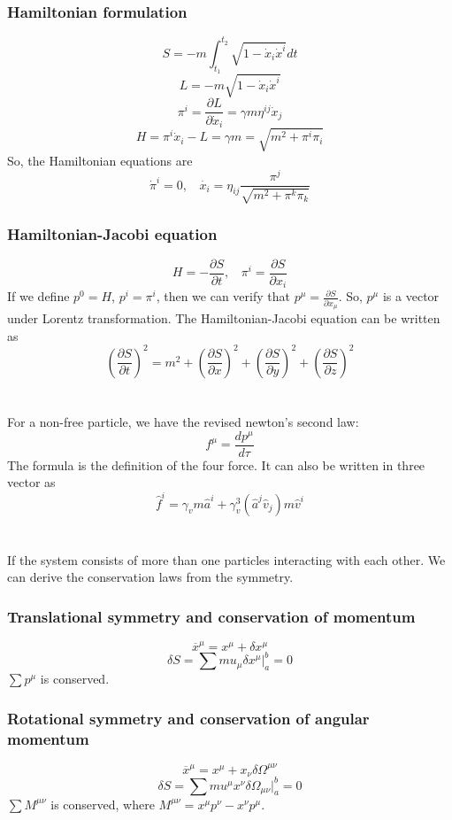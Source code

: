 \documentclass[cyan]{elegantnote}
\begin{document}
\subsubsection{Hamiltonian formulation}
\[S = -m \int_{t_1}^{t_2} \sqrt{1-\dot{x}_i\dot{x}^i} dt\]
\[L = - m \sqrt{1-\dot{x}_i\dot{x}^i}\]
\[\pi^i = \frac{\partial L}{\partial \dot{x}_i} = \gamma m \eta^{ij}\dot{x}_j\]
\[H = \pi^i \dot{x}_i - L = \gamma m = \sqrt{m^2 + \pi^i \pi_i}\]
So, the Hamiltonian equations are
\[\dot{\pi}^i = 0, \ \ \ \ \dot{x_i} = \eta_{ij}\frac{\pi^j}{\sqrt{m^2 + \pi^k \pi_k}}\]
\subsubsection{Hamiltonian-Jacobi equation}
\[H = -\frac{\partial S}{\partial t}, \ \ \ \ \pi^i = \frac{\partial S}{\partial x_i}\]
If we define $p^0 = H$, $p^i = \pi^i$, then we can verify that $p^{\mu} = \frac{\partial S}{\partial x_{\mu}}$. So, $p^{\mu}$ is a vector under Lorentz transformation. The Hamiltonian-Jacobi equation can be written as
\[(\frac{\partial S}{\partial t})^2 = m^2 + (\frac{\partial S}{\partial x})^2 + (\frac{\partial S}{\partial y})^2 + (\frac{\partial S}{\partial z})^2\]\\ \\
For a non-free particle, we have the revised newton's second law:
\[f^{\mu} = \frac{dp^{\mu}}{d\tau}\]
The formula is the definition of the four force. It can also be written in three vector as
\[\hat{f}^i = \gamma_v m \hat{a}^i + \gamma_v^3 (\hat{a}^j \hat{v}_j) m \hat{v}^i\]\\ \\
If the system consists of more than one particles interacting with each other. We can derive the conservation laws from the symmetry.
\subsubsection{Translational symmetry and conservation of momentum}
\[\overline{x}^{\mu} = x^{\mu} + \delta x^{\mu}\]
\[\delta S = \sum mu_{\mu} \delta x^{\mu}|_a^b = 0 \]
$\sum p^{\mu}$ is conserved.
\subsubsection{Rotational symmetry and conservation of angular momentum}
\[\overline{x}^{\mu} = x^{\mu} + x_{\nu}\delta \Omega^{\mu \nu}\]
\[\delta S = \sum mu^{\mu} x^{\nu} \delta \Omega_{\mu \nu}|_a^b = 0 \]
$\sum M^{\mu \nu} $ is conserved, where $M^{\mu \nu} = x^{\mu}p^{\nu} - x^{\nu}p^{\mu}$.
\end{document}
